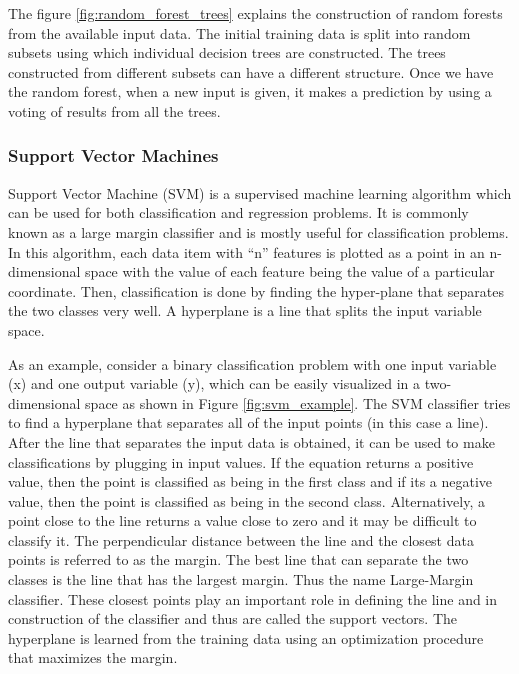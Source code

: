 \documentclass[11pt,openright]{report}
\begin{document}
The figure \ref{fig:random_forest_trees} explains the construction of random forests from the available input data. The initial training data is split into random subsets using which individual decision trees are constructed. The trees constructed from different subsets can have a different structure. Once we have the random forest, when a new input is given, it makes a prediction by using a voting of results from all the trees.

\subsubsection {Support Vector Machines }

Support Vector Machine (SVM) is a supervised machine learning algorithm which can be used for both classification and regression problems. It is commonly known as a large margin classifier and is mostly useful for classification problems. In this algorithm, each data item with ``n'' features is plotted as a point in an n-dimensional space with the value of each feature being the value of a particular coordinate. Then, classification is done by finding the hyper-plane that separates the two classes very well. A hyperplane is a line that splits the input variable space.

As an example, consider a binary classification problem with one input variable (x) and one output variable (y), which can be easily visualized in a two-dimensional space as shown in Figure \ref{fig:svm_example}. The SVM classifier tries to find a hyperplane that separates all of the input points (in this case a line). After the line that separates the input data is obtained, it can be used to make classifications by plugging in input values. If the equation returns a positive value, then the point is classified as being in the first class and if its a negative value, then the point is classified as being in the second class. Alternatively, a point close to the line returns a value close to zero and it may be difficult to classify it. The perpendicular distance between the line and the closest data points is referred to as the margin. The best line that can separate the two classes is the line that has the largest margin. Thus the name Large-Margin classifier. These closest points play an important role in defining the line and in construction of the classifier and thus are called the support vectors. The hyperplane is learned from the training data using an optimization procedure that maximizes the margin.
\end{document}
